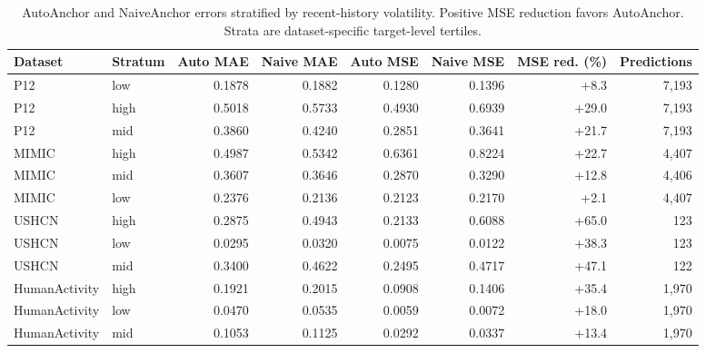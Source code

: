 \begin{table}[t]
\caption{AutoAnchor and NaiveAnchor errors stratified by recent-history volatility. Positive MSE reduction favors AutoAnchor. Strata are dataset-specific target-level tertiles.}
\label{tab:anchor-volatility-strata}
\centering
\scriptsize
\begin{tabular}{llrrrrrr}
\toprule
Dataset & Stratum & Auto MAE & Naive MAE & Auto MSE & Naive MSE & MSE red. (\%) & Predictions \\
\midrule
P12 & low & 0.1878 & 0.1882 & 0.1280 & 0.1396 & +8.3 & 7,193 \\
P12 & high & 0.5018 & 0.5733 & 0.4930 & 0.6939 & +29.0 & 7,193 \\
P12 & mid & 0.3860 & 0.4240 & 0.2851 & 0.3641 & +21.7 & 7,193 \\
MIMIC & high & 0.4987 & 0.5342 & 0.6361 & 0.8224 & +22.7 & 4,407 \\
MIMIC & mid & 0.3607 & 0.3646 & 0.2870 & 0.3290 & +12.8 & 4,406 \\
MIMIC & low & 0.2376 & 0.2136 & 0.2123 & 0.2170 & +2.1 & 4,407 \\
USHCN & high & 0.2875 & 0.4943 & 0.2133 & 0.6088 & +65.0 & 123 \\
USHCN & low & 0.0295 & 0.0320 & 0.0075 & 0.0122 & +38.3 & 123 \\
USHCN & mid & 0.3400 & 0.4622 & 0.2495 & 0.4717 & +47.1 & 122 \\
HumanActivity & high & 0.1921 & 0.2015 & 0.0908 & 0.1406 & +35.4 & 1,970 \\
HumanActivity & low & 0.0470 & 0.0535 & 0.0059 & 0.0072 & +18.0 & 1,970 \\
HumanActivity & mid & 0.1053 & 0.1125 & 0.0292 & 0.0337 & +13.4 & 1,970 \\
\bottomrule
\end{tabular}
\end{table}
